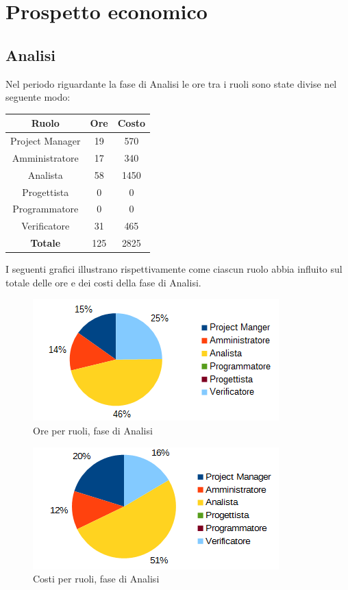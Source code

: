 \section{Prospetto economico}
	\subsection{Analisi}
	Nel periodo riguardante la fase di Analisi le ore tra i ruoli sono state divise nel seguente modo: \\
	\begin{table}[H]
		\centering
		\begin{tabular}{|c|c|c|}
			\hline
			\textbf{Ruolo}		& \textbf{Ore}	& \textbf{Costo} \\
			\hline
			Project Manager		& 19			& 570	\\
			Amministratore		& 17			& 340	\\
			Analista			& 58			& 1450	\\
			Progettista			& 0				& 0	\\
			Programmatore		& 0				& 0	\\
			Verificatore		& 31			& 465	\\
			\hline
			\textbf{Totale}		& 125			& 2825	\\
			\hline
		\end{tabular}
		\end{table}
	I seguenti grafici illustrano rispettivamente come ciascun ruolo abbia influito sul totale
delle ore e dei costi della fase di Analisi. \\
	\begin{figure}[H]
		\centering
		\includegraphics[scale=1]{immagini/grafici/analisi-torta.png}
		\caption{Ore per ruoli, fase di Analisi}
	\end{figure}
	\begin{figure}[H]
		\centering
		\includegraphics[scale=1]{immagini/grafici/analisi-torta-costo.png}
		\caption{Costi per ruoli, fase di Analisi}
	\end{figure}
